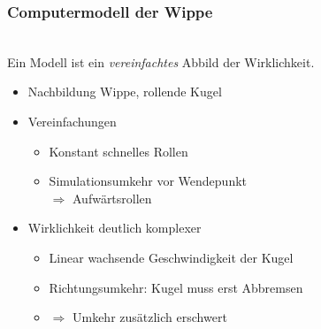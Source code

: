 \documentclass{beamer}
\newcommand{\imply}{$\Rightarrow$}
\begin{document}
\begin{frame}
  \frametitle{Computermodell der Wippe}
  \vspace{-2.5cm}\\
  Ein Modell ist ein {\em vereinfachtes} Abbild der Wirklichkeit.
  \begin{itemize}
    \item<2->  Nachbildung Wippe, rollende Kugel
    \item<3->  Vereinfachungen
      \begin{itemize}
        \item<4->  Konstant schnelles Rollen
        \item<5->  Simulationsumkehr vor Wendepunkt\\
          \imply{} Aufwärtsrollen
      \end{itemize}
    \item<6->  Wirklichkeit deutlich komplexer
      \begin{itemize}
        \item<7->  Linear wachsende Geschwindigkeit der Kugel
        \item<8->  Richtungsumkehr: Kugel muss erst Abbremsen
        \item<9->  \imply{} Umkehr zusätzlich erschwert
      \end{itemize}
  \end{itemize}
\end{frame}
\end{document}
